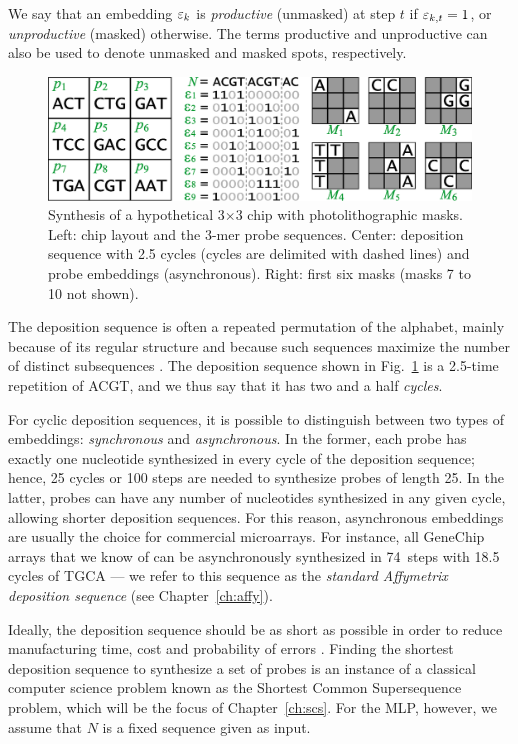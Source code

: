 We say that an embedding $\varepsilon_k$ is \emph{productive} (unmasked) at step $t$ if
$\varepsilon_{k,t} = 1$, or \emph{unproductive} (masked) otherwise. The terms
productive and unproductive can also be used to denote unmasked and masked
spots, respectively.

\begin{figure}[t]\centering
\centerline{\includegraphics[width=\textwidth]{figures/chip.eps}}
\caption{Synthesis of a hypothetical 3$\times$3 chip with photolithographic
  masks. Left: chip layout and the 3-mer probe sequences. Center: deposition
  sequence with 2.5 cycles (cycles are delimited with dashed lines) and probe
  embeddings (asynchronous). Right: first six masks (masks 7 to 10 not shown).}
\label{fig:masking_process}
\end{figure}

The deposition sequence is often a repeated permutation of the alphabet, mainly
because of its regular structure and because such sequences maximize the number
of distinct subsequences \citep{Chase1976}. The deposition sequence shown in
Fig.~\ref{fig:masking_process} is a 2.5-time repetition of ACGT, and we thus say
that it has two and a half \emph{cycles}.

For cyclic deposition sequences, it is possible to distinguish between two types
of embeddings: \emph{synchronous} and \emph{asynchronous}. In the former, each
probe has exactly one nucleotide synthesized in every cycle of the deposition
sequence; hence, 25 cycles or 100 steps are needed to synthesize probes of
length 25. In the latter, probes can have any number of nucleotides synthesized
in any given cycle, allowing shorter deposition sequences. For this reason,
asynchronous embeddings are usually the choice for commercial microarrays.  For
instance, all GeneChip arrays that we know of can be asynchronously synthesized
in 74~steps with 18.5 cycles of TGCA --- we refer to this sequence as the
\emph{standard Affymetrix deposition sequence} (see Chapter~\ref{ch:affy}).

Ideally, the deposition sequence should be as short as possible in order to
reduce manufacturing time, cost and probability of errors \citep{Rahmann2003}.
Finding the shortest deposition sequence to synthesize a set of probes is an
instance of a classical computer science problem known as the Shortest Common
Supersequence problem, which will be the focus of Chapter~\ref{ch:scs}. For the
MLP, however, we assume that $N$ is a fixed sequence given as input.

